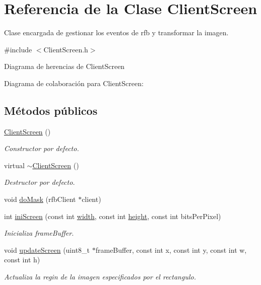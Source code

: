 \hypertarget{classClientScreen}{\section{Referencia de la Clase Client\-Screen}
\label{classClientScreen}
}


Clase encargada de gestionar los eventos de rfb y transformar la imagen.  




{\ttfamily \#include $<$Client\-Screen.\-h$>$}



Diagrama de herencias de Client\-Screen


Diagrama de colaboración para Client\-Screen\-:
\subsection*{Métodos públicos}
\begin{DoxyCompactItemize}
\item 
\hyperlink{classClientScreen_a4918c7b39d6ffbd66b00447e0eea66b5}{Client\-Screen} ()
\begin{DoxyCompactList}\small\item\em Constructor por defecto. \end{DoxyCompactList}\item 
virtual \hyperlink{classClientScreen_a4cda5f769adf88c13e2d16653f12eee5}{$\sim$\-Client\-Screen} ()
\begin{DoxyCompactList}\small\item\em Destructor por defecto. \end{DoxyCompactList}\item 
void \hyperlink{classClientScreen_ac3afa184bedeb1c0b53da93ae9792d9c}{do\-Mask} (rfb\-Client $\ast$client)
\item 
int \hyperlink{classClientScreen_a319d02c12d61c5b78c500a6ddcf8ca74}{ini\-Screen} (const int \hyperlink{classClientScreen_ac6f888c59861f6cca2f0ed9ea2c6b81b}{width}, const int \hyperlink{classClientScreen_ad6ead1ee3668a762e8fe2a0912ed282c}{height}, const int bits\-Per\-Pixel)
\begin{DoxyCompactList}\small\item\em Inicializa frame\-Buffer. \end{DoxyCompactList}\item 
void \hyperlink{classClientScreen_a949b67312c5f00fd4b58dd2b2685a6c5}{update\-Screen} (uint8\-\_\-t $\ast$frame\-Buffer, const int x, const int y, const int w, const int h)
\begin{DoxyCompactList}\small\item\em Actualiza la regin de la imagen especificados por el rectangulo. \end{DoxyCompactList}\end{DoxyCompactItemize}

